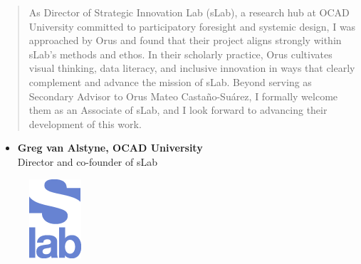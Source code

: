 \begin{quote}
    As Director of Strategic Innovation Lab (sLab), a research hub at OCAD University committed to participatory foresight and systemic design, I was approached by Orus and found that their project aligns strongly within sLab’s methods and ethos. In their scholarly practice, Orus cultivates visual thinking, data literacy, and inclusive innovation in ways that clearly complement and advance the mission of sLab. Beyond serving as Secondary Advisor to Orus Mateo Castaño-Suárez, I formally welcome them as an Associate of sLab, and I look forward to advancing their development of this work.
\end{quote}

\begin{itemize}
    \item[]  \textbf{Greg van Alstyne, OCAD University} \\
	Director and co-founder of sLab
\end{itemize}

\begin{figure}[h]
    \centering
    \includegraphics[width=0.1\linewidth]{figures/p2.png}
\end{figure}


